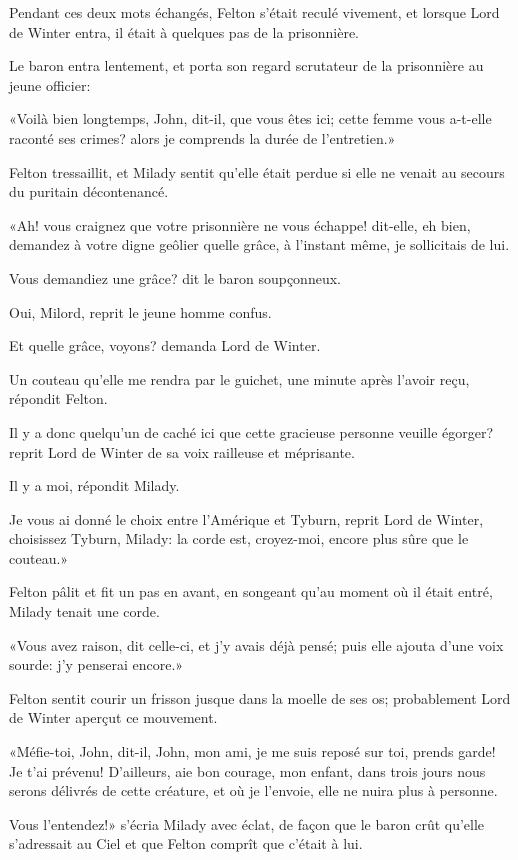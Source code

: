 Pendant ces deux mots échangés, Felton s'était reculé vivement, et lorsque Lord de Winter entra, il était à quelques pas de la prisonnière. 

Le baron entra lentement, et porta son regard scrutateur de la prisonnière au jeune officier: 

«Voilà bien longtemps, John, dit-il, que vous êtes ici; cette femme vous a-t-elle raconté ses crimes? alors je comprends la durée de l'entretien.» 

Felton tressaillit, et Milady sentit qu'elle était perdue si elle ne venait au secours du puritain décontenancé. 

«Ah! vous craignez que votre prisonnière ne vous échappe! dit-elle, eh bien, demandez à votre digne geôlier quelle grâce, à l'instant même, je sollicitais de lui. 

\speak  Vous demandiez une grâce? dit le baron soupçonneux. 

\speak  Oui, Milord, reprit le jeune homme confus. 

\speak  Et quelle grâce, voyons? demanda Lord de Winter. 

\speak  Un couteau qu'elle me rendra par le guichet, une minute après l'avoir reçu, répondit Felton. 

\speak  Il y a donc quelqu'un de caché ici que cette gracieuse personne veuille égorger? reprit Lord de Winter de sa voix railleuse et méprisante. 

\speak  Il y a moi, répondit Milady. 

\speak  Je vous ai donné le choix entre l'Amérique et Tyburn, reprit Lord de Winter, choisissez Tyburn, Milady: la corde est, croyez-moi, encore plus sûre que le couteau.» 

Felton pâlit et fit un pas en avant, en songeant qu'au moment où il était entré, Milady tenait une corde. 

«Vous avez raison, dit celle-ci, et j'y avais déjà pensé; puis elle ajouta d'une voix sourde: j'y penserai encore.» 

Felton sentit courir un frisson jusque dans la moelle de ses os; probablement Lord de Winter aperçut ce mouvement. 

«Méfie-toi, John, dit-il, John, mon ami, je me suis reposé sur toi, prends garde! Je t'ai prévenu! D'ailleurs, aie bon courage, mon enfant, dans trois jours nous serons délivrés de cette créature, et où je l'envoie, elle ne nuira plus à personne. 

\speak  Vous l'entendez!» s'écria Milady avec éclat, de façon que le baron crût qu'elle s'adressait au Ciel et que Felton comprît que c'était à lui. 


